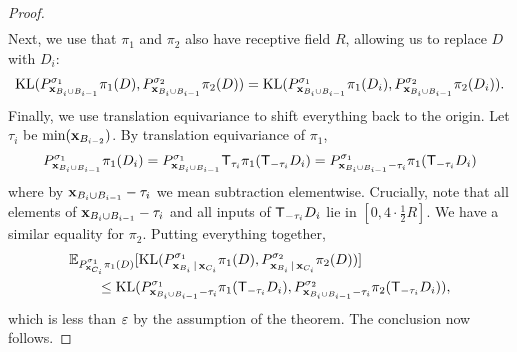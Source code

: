 \documentclass[12pt, twoside]{report}
\begin{document}
\begin{proof}
\begin{align}
    \end{align}
    Next, we use that $\pi_1$ and $\pi_2$ also have receptive field $R$, allowing us to replace $D$ with $D_i$:
    \begin{align}
        \operatorname{KL}(
            P_{\mathbf{x}_{B_i \cup B_{i-1}}}^{\sigma_1} \pi_1(D),
            P_{\mathbf{x}_{B_i \cup B_{i-1}}}^{\sigma_2} \pi_2(D)
            )
        = \operatorname{KL}(
            P_{\mathbf{x}_{B_i \cup B_{i-1}}}^{\sigma_1} \pi_1(D_i),
            P_{\mathbf{x}_{B_i \cup B_{i-1}}}^{\sigma_2} \pi_2(D_i)
            ).
    \end{align}
    Finally, we use translation equivariance to shift everything back to the origin.
    Let $\tau_i$ be $\operatorname*{min}(\mathbf{x}_{B_{i-2}})$.
    By translation equivariance of $\pi_1$,
    \begin{equation}
        P_{\vx_{B_i \cup B_{i-1}}}^{\sigma_1} \pi_1(D_i)
        = P_{\vx_{B_i \cup B_{i-1}}}^{\sigma_1} \T_{\tau_i} \pi_1(\T_{-\tau_i} D_i)
        = P_{\vx_{B_i \cup B_{i-1}} - \tau_i}^{\sigma_1} \pi_1(\T_{-\tau_i} D_i)
    \end{equation}
    where by $\mathbf{x}_{B_i \cup B_{i-1}} - \tau_i$ we mean subtraction elementwise.
    Crucially, note that all elements of $\mathbf{x}_{B_i \cup B_{i-1}} - \tau_i$ and all inputs of $\T_{-\tau_i} D_i$ lie in $[0, 4 \cdot \tfrac12 R]$.
    We have a similar equality for $\pi_2$.
    Putting everything together,
    \begin{align}
        &\E_{P^{\sigma_1}_{\vx_{C_i}}\pi_1(D)}[ \KL(
            P_{\vx_{B_i} \cond \vx_{C_i}}^{\sigma_1} \pi_1(D),
            P_{\vx_{B_i} \cond \vx_{C_i}}^{\sigma_2} \pi_2(D)
        )] \nonumber \\
        &\qquad\le \KL(
        P_{\vx_{B_i \cup B_{i-1}} - \tau_i}^{\sigma_1} \pi_1(\T_{-\tau_i}D_i),
        P_{\vx_{B_i \cup B_{i-1}} - \tau_i}^{\sigma_2} \pi_2(\T_{-\tau_i}D_i)
            ),
    \end{align}
    which is less than $\varepsilon$ by the assumption of the theorem.
    The conclusion now follows.
\end{proof}
\end{document}
